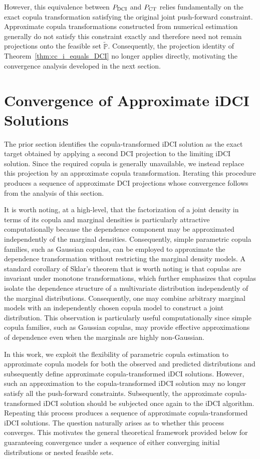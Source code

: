 \documentclass{article}
\newcommand{\p}{\mathbb{P}}
\begin{document}
However, this equivalence between $P_{\rm DCI}$ and $P_{\rm CT}$ relies fundamentally on the exact copula transformation satisfying the original joint push-forward constraint. Approximate copula transformations constructed from numerical estimation generally do not satisfy this constraint exactly and therefore need not remain projections onto the feasible set $\widetilde{\p}$. Consequently, the projection identity of Theorem~\ref{thm:cc_i_equals_DCI} no longer applies directly, motivating the convergence analysis developed in the next section.

\section{Convergence of Approximate iDCI Solutions}\label{sec:iDCI_sequences}

The prior section identifies the copula-transformed iDCI solution as the exact target obtained by applying a second DCI projection to the limiting iDCI solution.
Since the required copula is generally unavailable, we instead replace this projection by an approximate copula transformation.
Iterating this procedure produces a sequence of approximate DCI projections whose convergence follows from the analysis of this section.

It is worth noting, at a high-level, that the factorization of a joint density in terms of its copula and marginal densities is particularly attractive computationally because the dependence component may be approximated independently of the marginal densities. Consequently, simple parametric copula families, such as Gaussian copulas, can be employed to approximate the dependence transformation without restricting the marginal density models.
A standard corollary of Sklar's theorem that is worth noting is that copulas are invariant under monotone transformations,
which further emphasizes that copulas isolate the dependence structure of a multivariate distribution independently of the marginal distributions.
Consequently, one may combine arbitrary marginal models with an independently chosen copula model to construct a joint distribution.
This observation is particularly useful computationally since simple copula families, such as Gaussian copulas, may provide effective approximations of dependence even when the marginals are highly non-Gaussian.

In this work, we exploit the flexibility of parametric copula estimation to approximate copula models for both the observed and predicted distributions and subsequently define approximate copula-transformed iDCI solutions.
However, such an approximation to the copula-transformed iDCI solution may no longer satisfy all the push-forward constraints.
Subsequently, the approximate copula-transformed iDCI solution should be subjected once again to the iDCI algorithm.
Repeating this process produces
a sequence of approximate copula-transformed iDCI solutions.
The question naturally arises as to whether this process converges.
This motivates the general theoretical framework provided below for guaranteeing convergence under a sequence of either converging initial distributions or nested feasible sets.
\end{document}
